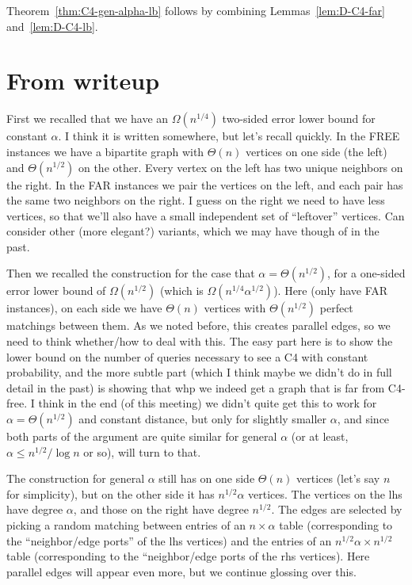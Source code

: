 \bigskip
Theorem~\ref{thm:C4-gen-alpha-lb} follows by combining Lemmas~\ref{lem:D-C4-far} and~\ref{lem:D-C4-lb}.

\iffalse
\newpage
\section{From writeup}



First we recalled that we have an $\Omega(n^{1/4})$ two-sided error lower bound for constant $\alpha$. I think it is written somewhere, but let's recall quickly. In the FREE instances we have a bipartite graph with $\Theta(n)$ vertices on one side (the left) and $\Theta(n^{1/2})$ on the other. Every vertex on the left has two unique neighbors on the right. In the FAR instances we pair the vertices on the left, and each pair has the same two neighbors on the right. I guess on the right we need to have less vertices, so that we'll also have a small independent set of ``leftover'' vertices. Can consider other (more elegant?) variants, which we may have though of in the past.

Then we recalled the construction for the case that $\alpha = \Theta(n^{1/2})$, for a one-sided error lower bound of $\Omega(n^{1/2})$ (which is $\Omega(n^{1/4} \alpha^{1/2})$). Here (only have FAR instances), on each side we have $\Theta(n)$ vertices with $\Theta(n^{1/2})$ perfect matchings between them. As we noted before, this creates parallel edges, so we need to think whether/how to deal with this. The easy part here is to show the lower bound on the number of queries necessary to see a C4  with constant probability, and the more subtle part (which I think maybe we didn't do in full detail in the past) is showing that whp we indeed get a graph that is far from C4-free. I think in the end (of this meeting) we didn't quite get this to work for $\alpha = \Theta(n^{1/2})$ and constant distance, but only for slightly smaller $\alpha$, and since  both parts of the argument are quite similar for general $\alpha$ (or at least, $\alpha \leq n^{1/2}/\log n$ or so), will turn to that.

The construction for general $\alpha$ still has on one side $\Theta(n)$ vertices (let's say $n$ for simplicity), but on the other side it has $n^{1/2}\alpha$ vertices. The vertices on the lhs have degree $\alpha$, and those on the right have degree $n^{1/2}$.
The edges are selected by picking a random matching between entries of an $n\times \alpha$ table (corresponding to the ``neighbor/edge ports'' of the lhs vertices) and the entries of an $n^{1/2}\alpha \times n^{1/2}$ table (corresponding to the ``neighbor/edge ports of the rhs vertices). Here parallel edges will appear even more, but we continue glossing over this.

